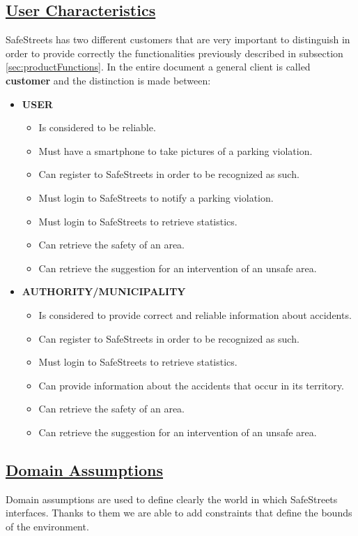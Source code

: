 \subsection[User Characteristics]{\hyperlink{toc}{User Characteristics}}
	SafeStreets has two different customers that are very important to distinguish in order to provide correctly the functionalities previously described in subsection \ref{sec:productFunctions}. In the entire document a general client is called \textbf{customer} and the distinction is made between:
	
	\begin{itemize}
		\item \textbf{USER}
			\begin{itemize}
				\item Is considered to be reliable.
				\item Must have a smartphone to take pictures of a parking violation.
				\item Can register to SafeStreets in order to be recognized as such.
				\item Must login to SafeStreets to notify a parking violation.
				\item Must login to SafeStreets to retrieve statistics.
				\item Can retrieve the safety of an area.
				\item Can retrieve the suggestion for an intervention of an unsafe area.
			\end{itemize}
		\item \textbf{AUTHORITY/MUNICIPALITY}
			\begin{itemize}
				\item Is considered to provide correct and reliable information about accidents.
				\item Can register to SafeStreets in order to be recognized as such.
				\item Must login to SafeStreets to retrieve statistics.
				\item Can provide information about the accidents that occur in its territory.
				\item Can retrieve the safety of an area.
				\item Can retrieve the suggestion for an intervention of an unsafe area.
			\end{itemize}
	\end{itemize}
	
\subsection[Domain Assumptions]{\hyperlink{toc}{Domain Assumptions}}
	\label{sec:domainAssumptions}
	Domain assumptions are used to define clearly the world in which SafeStreets interfaces. Thanks to them we are able to add constraints that define the bounds of the environment. \\
	
